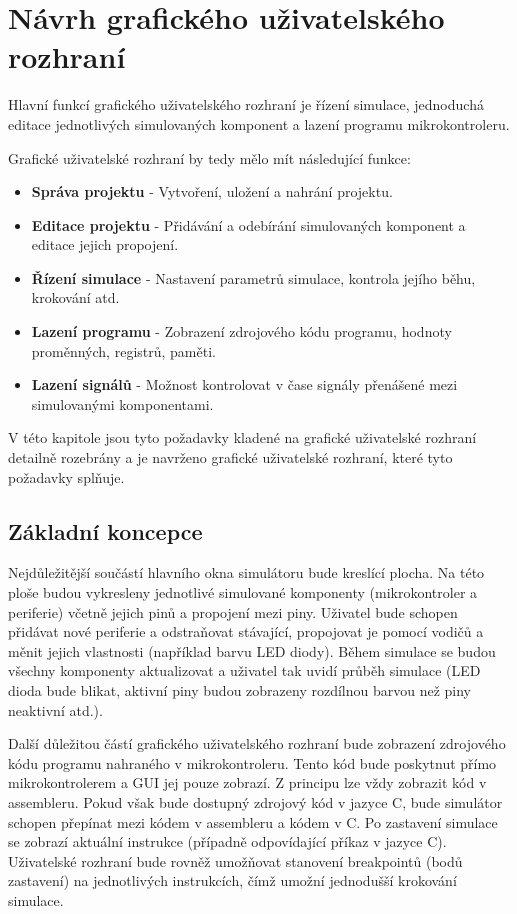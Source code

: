 \section{Návrh grafického uživatelského rozhraní}

Hlavní funkcí grafického uživatelského rozhraní je řízení simulace, jednoduchá editace jednotlivých simulovaných komponent a lazení programu mikrokontroleru.

Grafické uživatelské rozhraní by tedy mělo mít následující funkce:

\begin{itemize}
\item \textbf{Správa projektu} - Vytvoření, uložení a nahrání projektu.
\item \textbf{Editace projektu} - Přidávání a odebírání simulovaných komponent a editace jejich propojení.
\item \textbf{Řízení simulace} - Nastavení parametrů simulace, kontrola jejího běhu, krokování atd.
\item \textbf{Lazení programu} - Zobrazení zdrojového kódu programu, hodnoty proměnných, registrů, paměti.
\item \textbf{Lazení signálů} - Možnost kontrolovat v čase signály přenášené mezi simulovanými komponentami.
\end{itemize}

V této kapitole jsou tyto požadavky kladené na grafické uživatelské rozhraní detailně rozebrány a je navrženo grafické uživatelské rozhraní, které tyto
požadavky splňuje.

\subsection{Základní koncepce}

Nejdůležitější součástí hlavního okna simulátoru bude kreslící plocha. Na této ploše budou vykresleny jednotlivé simulované komponenty (mikrokontroler
a periferie) včetně jejich pinů a propojení mezi piny. Uživatel bude schopen přidávat nové periferie a odstraňovat stávající, propojovat je pomocí
vodičů a měnit jejich vlastnosti (například barvu LED diody). Během simulace se budou všechny komponenty aktualizovat a uživatel tak uvidí průběh simulace
(LED dioda bude blikat, aktivní piny budou zobrazeny rozdílnou barvou než piny neaktivní atd.).

Další důležitou částí grafického uživatelského rozhraní bude zobrazení zdrojového kódu programu nahraného v mikrokontroleru. Tento kód bude poskytnut
přímo mikrokontrolerem a GUI jej pouze zobrazí. Z principu lze vždy zobrazit kód v assembleru. Pokud však bude dostupný zdrojový kód v jazyce C, bude 
simulátor schopen přepínat mezi kódem v assembleru a kódem v C. Po zastavení simulace se zobrazí aktuální instrukce (případně odpovídající příkaz v jazyce C). Uživatelské rozhraní bude rovněž umožňovat stanovení breakpointů (bodů zastavení) na jednotlivých instrukcích, čímž umožní jednodušší krokování
simulace.

